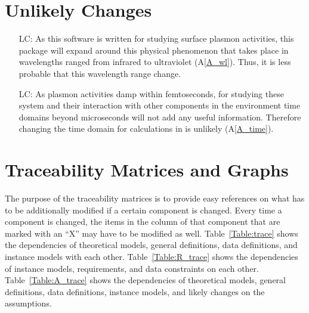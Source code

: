 \documentclass[12pt]{article}
\newcounter{lcnum} %
\begin{document}
	\section{Unlikely Changes}
	
	\noindent \begin{itemize}
		
		\item[LC\refstepcounter{lcnum}\thelcnum\label{LC_wavelength}:] As this software
		is written for studying surface plasmon activities, this package will expand
		around this physical phenomenon that takes place in wavelengths ranged from
		infrared to ultraviolet (A\ref{A_wl}). Thus, it is less probable that this
		wavelength range change.
		
		\item[LC\refstepcounter{lcnum}\thelcnum\label{LC_time}:] As plasmon activities
		damp within femtoseconds, for studying these system and their interaction with
		other components in the environment time domains beyond microseconds will not
		add any useful information. Therefore changing the time domain for calculations
		in is unlikely (A\ref{A_time}).
		
	\end{itemize}
	
	\section{Traceability Matrices and Graphs}
	
	The purpose of the traceability matrices is to provide easy references on what
	has to be additionally modified if a certain component is changed.  Every time a
	component is changed, the items in the column of that component that are marked
	with an ``X'' may have to be modified as well.  Table~\ref{Table:trace} shows
	the dependencies of theoretical models, general definitions, data definitions,
	and instance models with each other. Table~\ref{Table:R_trace} shows the
	dependencies of instance models, requirements, and data constraints on each
	other. Table~\ref{Table:A_trace} shows the dependencies of theoretical models,
	general definitions, data definitions, instance models, and likely changes on
	the assumptions.
	
\end{document}
